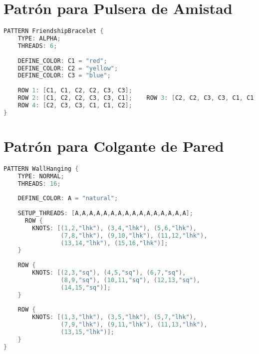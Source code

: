 \documentclass[12pt,a4paper]{report}
\begin{document}
\section{Patrón para Pulsera de Amistad}
\begin{lstlisting}[language=C++, caption=Ejemplo de patrón para pulsera de amistad]
PATTERN FriendshipBracelet {
    TYPE: ALPHA;
    THREADS: 6;
    
    DEFINE_COLOR: C1 = "red";
    DEFINE_COLOR: C2 = "yellow";
    DEFINE_COLOR: C3 = "blue";
    
    ROW 1: [C1, C1, C2, C2, C3, C3];
    ROW 2: [C1, C2, C2, C3, C3, C1];    ROW 3: [C2, C2, C3, C3, C1, C1];
    ROW 4: [C2, C3, C3, C1, C1, C2];
}
\end{lstlisting}

\section{Patrón para Colgante de Pared}
\begin{lstlisting}[language=C++, caption=Ejemplo de patrón para colgante de pared]
PATTERN WallHanging {
    TYPE: NORMAL;
    THREADS: 16;
    
    DEFINE_COLOR: A = "natural";
    
    SETUP_THREADS: [A,A,A,A,A,A,A,A,A,A,A,A,A,A,A,A];
      ROW {
        KNOTS: [(1,2,"lhk"), (3,4,"lhk"), (5,6,"lhk"), 
                (7,8,"lhk"), (9,10,"lhk"), (11,12,"lhk"),
                (13,14,"lhk"), (15,16,"lhk")];
    }
    
    ROW {
        KNOTS: [(2,3,"sq"), (4,5,"sq"), (6,7,"sq"), 
                (8,9,"sq"), (10,11,"sq"), (12,13,"sq"),
                (14,15,"sq")];
    }
    
    ROW {
        KNOTS: [(1,3,"lhk"), (3,5,"lhk"), (5,7,"lhk"),
                (7,9,"lhk"), (9,11,"lhk"), (11,13,"lhk"),
                (13,15,"lhk")];
    }
}
\end{lstlisting}
\end{document}
